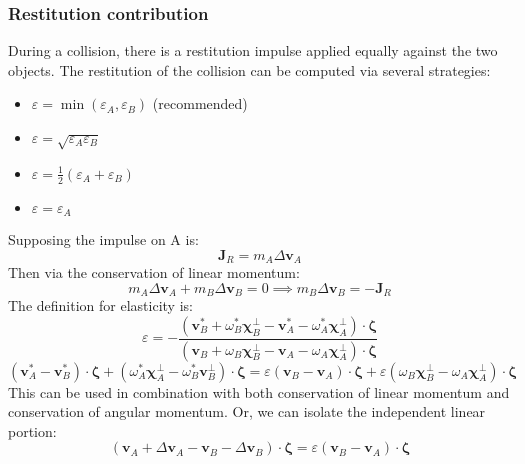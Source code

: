 \documentclass[10pt]{report}
\begin{document}
\subsubsection{Restitution contribution}
During a collision, there is a restitution impulse applied equally against the two objects. The restitution of the collision can be computed via several strategies:
\begin{itemize}
\item $\varepsilon=\min(\varepsilon_A,\varepsilon_B)$ (recommended)
\item $\varepsilon=\sqrt{\varepsilon_A\varepsilon_B}$
\item $\varepsilon=\frac{1}{2}(\varepsilon_A+\varepsilon_B)$
\item $\varepsilon=\varepsilon_A$
\end{itemize}
Supposing the impulse on A is:
\begin{equation}\boldsymbol{J}_R=m_A\Delta\boldsymbol{v}_A\end{equation}
Then via the conservation of linear momentum:
\begin{equation}m_A\Delta\boldsymbol{v}_A+m_B\Delta\boldsymbol{v}_B=0\implies m_B\Delta\boldsymbol{v}_B=-\boldsymbol{J}_R\end{equation}
The definition for elasticity is:
\begin{equation}\varepsilon=-\frac{(\boldsymbol{v}_B^*+\omega_B^*\boldsymbol{\chi}_B^\perp-\boldsymbol{v}_A^*-\omega_A^*\boldsymbol{\chi}_A^\perp)\cdot\boldsymbol{\zeta}}{(\boldsymbol{v}_B+\omega_B\boldsymbol{\chi}_B^\perp-\boldsymbol{v}_A-\omega_A\boldsymbol{\chi}_A^\perp)\cdot\boldsymbol{\zeta}}\end{equation}
\begin{equation}
(\boldsymbol{v}_A^*-\boldsymbol{v}_B^*)\cdot\boldsymbol{\zeta}+(\omega_A^*\boldsymbol{\chi}_A^\perp-\omega_B^*\boldsymbol{v}_B^\perp)\cdot\boldsymbol{\zeta}=\varepsilon(\boldsymbol{v}_B-\boldsymbol{v}_A)\cdot\boldsymbol{\zeta}+\varepsilon(\omega_B\boldsymbol{\chi}_B^\perp-\omega_A\boldsymbol{\chi}_A^\perp)\cdot\boldsymbol{\zeta}
\end{equation}
This can be used in combination with both conservation of linear momentum and conservation of angular momentum. Or, we can isolate the independent linear portion:
\begin{equation}(\boldsymbol{v}_A+\Delta\boldsymbol{v}_A-\boldsymbol{v}_B-\Delta\boldsymbol{v}_B)\cdot\boldsymbol{\zeta}=\varepsilon(\boldsymbol{v}_B-\boldsymbol{v}_A)\cdot\boldsymbol{\zeta}\end{equation}
\end{document}
